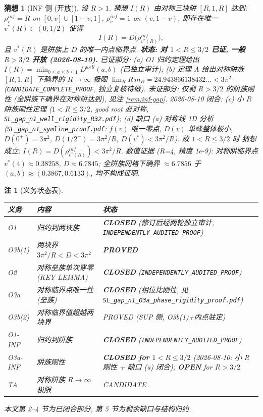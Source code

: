 \documentclass[UTF8]{ctexart}
\newtheorem{remark}[theorem]{注}
\newtheorem{conjecture}[theorem]{猜想}
\begin{document}
\begin{conjecture}[INF 侧 (开放)]
设 $R>1$. 猜想 $I(R)$ 由对称三块阱 $[R,1,R]$ 达到:
$\rho^{inf}_v=R$ on $[0,v]\cup[1-v,1]$, $\rho^{inf}_v=1$ on $(v,1-v)$,
即存在唯一 $v^*(R)\in(0,1/2)$ 使得
\begin{equation}
	I(R)=D\bigl(\rho^{inf}_{v^*(R)}\bigr),
\end{equation}
且 $v^*(R)$ 是阱族上 $D$ 的唯一内点临界点.
\textbf{状态: 对 $1<R\le3/2$ 已证, 一般 $R>3/2$ 开放 (2026-08-10).} 已证部分: (a) O1 归约定理给出
$I(R)=\min_{0\le a\le b\le1}D^{well}(a,b)$ (已独立审计); (b) 定理 A 给出对称阱族
$[R,1,R]$ 下确界的 $R\to\infty$ 极限 $\lim_R R\,m_R=24.943866138432\ldots<3\pi^2$
(\texttt{CANDIDATE\_COMPLETE\_PROOF}, 独立复核待做). 未证部分: 仅剩 $R>3/2$ 的阱族刚性 (全阱族下确界在对称阱达到), 见注 \ref{rem:inf-gap}.
2026-08-10 闭合: (c) 小 $R$ 阱族刚性定理 ($1<R\le3/2$, good root 必对称,
\texttt{SL\_gap\_n1\_well\_rigidity\_R32.pdf}); (d) 缺口 (a) 对称线 1D 分析
(\texttt{SL\_gap\_n1\_symline\_proof.pdf}: $f(v)$ 唯一零点, $D(v)$ 单峰整体极小,
$D(0^+)=3\pi^2$, $D(1/2^-)=3\pi^2/R$, $D(v^*)<3\pi^2/R$). 故 $1<R\le3/2$ 时
猜想成立: $I(R)=D(\rho^{inf}_{v^*(R)})<3\pi^2/R$. 数值证据 (R=4, 精度 1e-9):
对称阱临界点 $v^*(4)\approx0.38258$, $D\approx6.7845$; 全阱族网格下确界
$\approx6.7856$ 于 $(a,b)\approx(0.3867,0.6133)$, 均不构成证明.
\end{conjecture}

\begin{remark}[义务状态表]
\begin{center}
\footnotesize
\begin{tabular}{@{}lll@{}}
\toprule
义务 & 内容 & 状态 \\
\midrule
O1 & 归约到两块族 & \textbf{CLOSED} (修订后经两轮独立审计, \texttt{INDEPENDENTLY\_AUDITED\_PROOF}) \\
O3b(1) & 两块界 $3\pi^2/R<D<3\pi^2$ & \textbf{PROVED} \\
O2 & 对称垒族单次穿零 (KEY LEMMA) & \textbf{CLOSED} (\texttt{INDEPENDENTLY\_AUDITED\_PROOF}) \\
O3a & 对称临界点唯一性 (垒族) & \textbf{CLOSED} (相位比刚性, 见 \texttt{SL\_gap\_n1\_O3a\_phase\_rigidity\_proof.pdf}) \\
O3b(2) & 对称临界值超越两块界 & PROVED (SUP 侧, O3b(1)+内点驻定) \\
O1-INF & 归约到阱族 & \textbf{CLOSED} (\texttt{INDEPENDENTLY\_AUDITED\_PROOF}) \\
O3a-INF & 阱族刚性 & \textbf{CLOSED for $1<R\le3/2$} (2026-08-10: 小 R 刚性 + 缺口 (a) 闭合); \textbf{OPEN} for $R>3/2$ \\
TA & 对称阱族 $R\to\infty$ 极限 & CANDIDATE \\
\bottomrule
\end{tabular}
\end{center}
本文第 2--4 节为已闭合部分, 第 5 节为剩余缺口与结构归约.
\end{remark}
\end{document}
